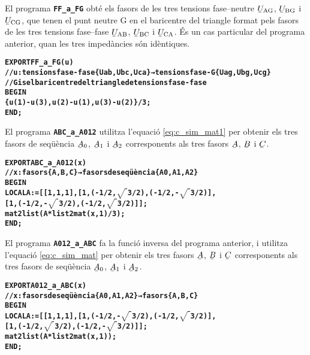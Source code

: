 El programa \texttt{\textbf{FF\_a\_FG}} obté els fasors de les tres tensions fase--neutre $\cmplx{U}\ped{AG}$, $\cmplx{U}\ped{BG}$ i $\cmplx{U}\ped{CG}$, que tenen el punt neutre G en el baricentre del triangle format pels fasors de  les tres tensions fase--fase
$\cmplx{U}\ped{AB}$, $\cmplx{U}\ped{BC}$ i $\cmplx{U}\ped{CA}$. És un cas particular del programa anterior, quan les tres impedàncies són idèntiques.
\vspace{-6mm}
\begin{alltt}
\bfseries
{}
    EXPORT FF_a_FG(u)
    // u:tensions fase-fase \{Uab,Ubc,Uca\} → tensions fase-G \{Uag,Ubg,Ucg\}
    // G is el baricentre del triangle de tensions fase-fase
    BEGIN
      \{u(1)-u(3),u(2)-u(1),u(3)-u(2)\}/3;
    END;
\end{alltt}

El programa \texttt{\textbf{ABC\_a\_A012}} utilitza l'equació \eqref{eq:c_sim_mat1} per obtenir els tres fasors de seqüència
$\cmplx{A}_0$, $\cmplx{A}_1$ i  $\cmplx{A}_2$ corresponents als tres fasors $\cmplx{A}$, $\cmplx{B}$ i $\cmplx{C}$.
\vspace{-6mm}
\begin{alltt}
\bfseries
{}
    EXPORT ABC_a_A012(x)
    // x:fasors \{A,B,C\} → fasors de seqüència \{A0,A1,A2\}
    BEGIN
      LOCAL A:=[[1,1,1],[1,(-1/2,\(\sqrt{\phantom{|}}\)3/2),(-1/2,-\(\sqrt{\phantom{|}}\)3/2)],
                [1,(-1/2,-\(\sqrt{\phantom{|}}\)3/2),(-1/2,\(\sqrt{\phantom{|}}\)3/2)]];
      mat2list(A*list2mat(x,1)/3);
    END;
\end{alltt}

El programa \texttt{\textbf{A012\_a\_ABC}} fa la funció inversa del programa anterior, i utilitza l'equació \eqref{eq:c_sim_mat} per obtenir els tres fasors
$\cmplx{A}$, $\cmplx{B}$ i $\cmplx{C}$  corresponents als tres fasors de seqüència
$\cmplx{A}_0$, $\cmplx{A}_1$ i  $\cmplx{A}_2$.
\vspace{-6mm}
\begin{alltt}
\bfseries
{}
    EXPORT A012_a_ABC(x)
    // x:fasors de seqüència \{A0,A1,A2\} → fasors \{A,B,C\}
    BEGIN
      LOCAL A:=[[1,1,1],[1,(-1/2,-\(\sqrt{\phantom{|}}\)3/2),(-1/2,\(\sqrt{\phantom{|}}\)3/2)],
                [1,(-1/2,\(\sqrt{\phantom{|}}\)3/2),(-1/2,-\(\sqrt{\phantom{|}}\)3/2)]];
      mat2list(A*list2mat(x,1));
    END;
\end{alltt}

